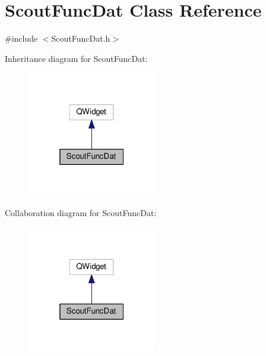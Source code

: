 \hypertarget{class_scout_func_dat}{\section{Scout\-Func\-Dat Class Reference}
\label{class_scout_func_dat}
}


{\ttfamily \#include $<$Scout\-Func\-Dat.\-h$>$}



Inheritance diagram for Scout\-Func\-Dat\-:\nopagebreak
\begin{figure}[H]
\begin{center}
\leavevmode
\includegraphics[width=160pt]{class_scout_func_dat__inherit__graph}
\end{center}
\end{figure}


Collaboration diagram for Scout\-Func\-Dat\-:\nopagebreak
\begin{figure}[H]
\begin{center}
\leavevmode
\includegraphics[width=160pt]{class_scout_func_dat__coll__graph}
\end{center}
\end{figure}
